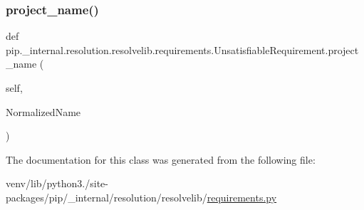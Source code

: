 \subsubsection{\texorpdfstring{project\+\_\+name()}{project\_name()}}
{\footnotesize\ttfamily def pip.\+\_\+internal.\+resolution.\+resolvelib.\+requirements.\+Unsatisfiable\+Requirement.\+project\+\_\+name (\begin{DoxyParamCaption}\item[{}]{self,  }\item[{}]{Normalized\+Name }\end{DoxyParamCaption})}



The documentation for this class was generated from the following file\+:\begin{DoxyCompactItemize}
\item 
venv/lib/python3./site-\/packages/pip/\+\_\+internal/resolution/resolvelib/\hyperlink{pip_2__internal_2resolution_2resolvelib_2requirements_8py}{requirements.\+py}\end{DoxyCompactItemize}
